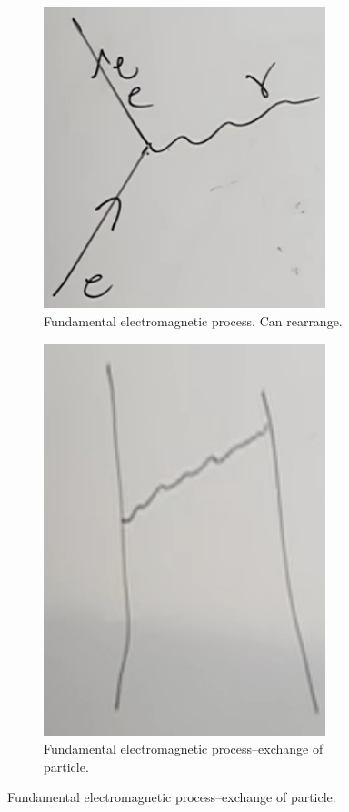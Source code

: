 \documentclass[]{article}
\begin{document}
\begin{figure}[H]
	\caption{Electromagnetic processes emerge from a Lagrangian: $\mathcal{L}$: $e \Psi_e^\dagger \Psi_e A$}\label{fig:fep}
	\begin{subfigure}{0.45\textwidth}
		\caption{Fundamental electromagnetic process. Can rearrange.}\label{fig:fep1}
		\includegraphics[width=0.9\textwidth]{2-1-em-process}
	\end{subfigure}
	\begin{subfigure}{0.45\textwidth}
		\caption{Fundamental electromagnetic process--exchange of particle.}\label{fig:fep2}
		\includegraphics[width=0.9\textwidth]{2-1-em-process-feynman}

\end{subfigure}
\end{figure}
\end{document}
